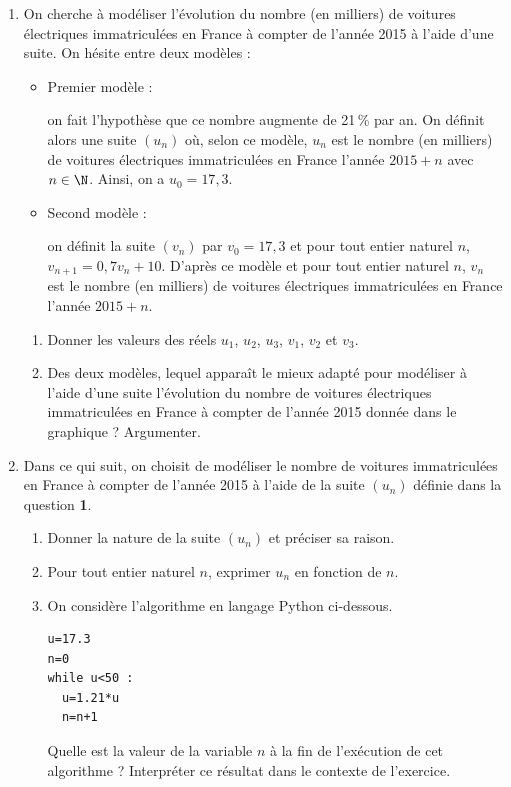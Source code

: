 \begin{enumerate}
\item  On cherche à modéliser l'évolution du nombre (en milliers) de voitures électriques immatriculées en France à compter de l'année 2015 à l'aide d'une suite. On hésite entre deux modèles :
\begin{itemize}
\item Premier modèle : 

on fait l'hypothèse que ce nombre augmente de 21\,\% par an. On définit alors une suite $\left(u_n\right)$ où, selon ce modèle, $u_n$ est le nombre (en milliers) de voitures électriques immatriculées en France l'année $2015+n$ avec $n\in \N$. Ainsi, on a $u_0=17,3$.
\item Second modèle :

on définit la suite $\left(v_n\right)$ par $v_0= 17,3$ et pour tout entier naturel $n$,
 \mbox{$v_{n+1}= 0,7v_n + 10$}. D'après ce modèle et pour tout entier naturel $n$, $v_n$ est le nombre (en milliers) de voitures électriques immatriculées en France l'année $2015+n$.
\end{itemize}

\begin{enumerate}
\item Donner les valeurs des réels $u_1$, $u_2$, $u_3$, $v_1$, $v_2$ et $v_3$.
\item Des deux modèles, lequel apparaît le mieux adapté pour modéliser à l'aide d'une suite l'évolution du nombre de voitures électriques immatriculées en France à compter de l'année 2015 donnée dans le graphique ? Argumenter.
\end{enumerate}
\item Dans ce qui suit, on choisit de modéliser le nombre de voitures immatriculées en France à compter de l'année 2015 à l'aide de la suite $\left(u_n\right)$ définie dans la question \textbf{1}.
	\begin{enumerate}
		\item  Donner la nature de la suite $\left(u_n\right)$ et préciser sa raison.
		\item Pour tout entier naturel $n$, exprimer $u_n$ en fonction de $n$.
		\item On considère l'algorithme en langage Python ci-dessous.
\begin{center}
\begin{lstlisting}[style=python]
u=17.3
n=0
while u<50 :
  u=1.21*u
  n=n+1
\end{lstlisting}
\end{center}

Quelle est la valeur de la variable $n$ à la fin de l'exécution de cet algorithme ? Interpréter ce
résultat dans le contexte de l'exercice.
	\end{enumerate}
\end{enumerate}

\vspace{0,5cm}

